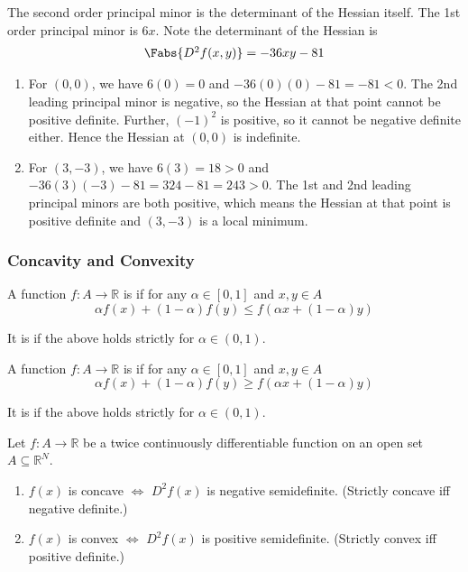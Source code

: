 \documentclass{article}
\begin{document}
The second order principal minor is the determinant of the Hessian itself. The 1st order principal minor is $6x$. Note the determinant of the Hessian is
\begin{equation}
  \begin{array}{c}
    \Fabs{D^2 f(x, y)} = -36xy - 81
  \end{array}
  \nonumber
\end{equation}

\begin{enumerate}
  \item For $(0, 0)$, we have $6(0) = 0$ and $-36(0)(0) - 81 = -81 < 0$. The 2nd leading principal minor is negative, so the Hessian at that point cannot be positive definite. Further, $(-1)^2$ is positive, so it cannot be negative definite either. Hence the Hessian at $(0, 0)$ is indefinite.

  \item For $(3, -3)$, we have $6(3) = 18 > 0$ and $-36(3)(-3) - 81 = 324 - 81 = 243 > 0$. The 1st and 2nd leading principal minors are both positive, which means the Hessian at that point is positive definite and $(3, -3)$ is a local minimum.
\end{enumerate}

\subsubsection{Concavity and Convexity}
\label{ssub:concavity_and_convexity}

\begin{definition}
  A function $f: A \to \mathbb{R}$ is  if for any $\alpha \in [0, 1]$ and $x, y \in A$
  \[
    \alpha f(x) + (1 - \alpha) f(y)
    \le
    f(\alpha x + (1 - \alpha) y)
  \]

  It is  if the above holds strictly for $\alpha \in (0, 1)$.
\end{definition}

\begin{definition}
  A function $f: A \to \mathbb{R}$ is  if for any $\alpha \in [0, 1]$ and $x, y \in A$
  \[
    \alpha f(x) + (1 - \alpha) f(y)
    \ge
    f(\alpha x + (1 - \alpha) y)
  \]

  It is  if the above holds strictly for $\alpha \in (0, 1)$.
\end{definition}

\begin{theorem}
  Let $f: A \to \mathbb{R}$ be a twice continuously differentiable function on an open set $A \subseteq \mathbb{R}^N$.
  \begin{enumerate}
    \item $f(x)$ is concave $\iff$ $D^2f(x)$ is negative semidefinite. (Strictly concave iff negative definite.)
    \item $f(x)$ is convex $\iff$ $D^2f(x)$ is positive semidefinite. (Strictly convex iff positive definite.)
  \end{enumerate}
\end{theorem}
\end{document}
